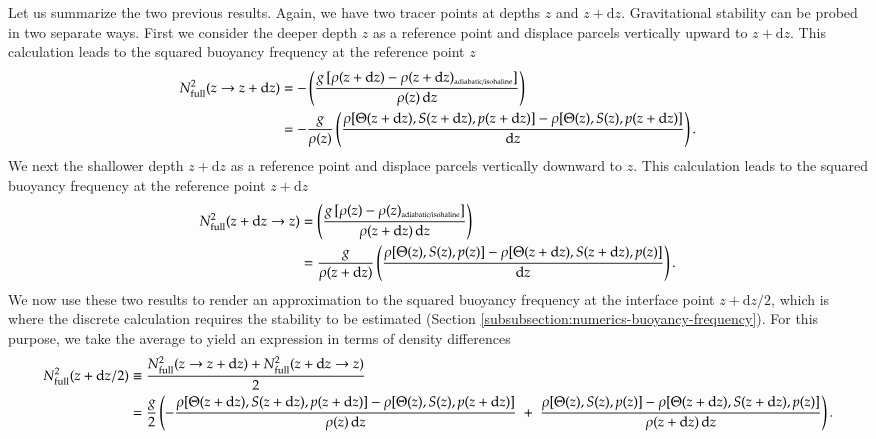 Let us summarize the two previous results.  Again, we have two tracer
points at depths $z$ and $z+\mathrm{d}z$.  Gravitational stability can
be probed in two separate ways. First we consider the deeper depth $z$
as a reference point and displace parcels vertically upward to
$z+\mathrm{d}z$.  This calculation leads to the squared buoyancy
frequency at the reference point $z$
\begin{equation}
\begin{split}
 N^{2}_{\mbox{\scriptsize full}}(z \rightarrow z + \mathrm{d}z)
 &=
 -\left(  \frac{g \, [\rho(z+\mathrm{d} z)  - \rho(z+\mathrm{d} z)_{\mbox{\tiny adiabatic/isohaline}} ]}{\rho(z)   \, \mathrm{d}z } \right)
\\
&=
 -\frac{g}{\rho(z)}  \left( 
 \frac{\rho[ \Theta(z + \mathrm{d} z), S(z + \mathrm{d} z), p(z + \mathrm{d} z)]
-
\rho[ \Theta(z), S(z), p(z + \mathrm{d}z)]
}{\mathrm{d}z}
\right).
\end{split}
\label{eq:inifinitesimal-delta-rho-elements-upwards-summary}
\end{equation}
We next the shallower depth $z+\mathrm{d}z$ as a reference point and
displace parcels vertically downward to $z$.  This calculation leads
to the squared buoyancy frequency at the reference point
$z+\mathrm{d}z$
\begin{equation}
\begin{split}
 N^{2}_{\mbox{\scriptsize full}}(z + \mathrm{d}z \rightarrow z)
 &=
 \left(  \frac{g \, [\rho(z)  - \rho(z)_{\mbox{\tiny adiabatic/isohaline}}  ]}{\rho(z+\mathrm{d}z)   \, \mathrm{d}z } \right)  
 \\
 &=
 \frac{g}{\rho(z+\mathrm{d}z)}  \left( 
 \frac{ \rho[ \Theta(z), S(z), p(z)]-
 \rho[ \Theta(z+\mathrm{d}z), S(z+\mathrm{d}z), p(z)]
  }{\mathrm{d}z}
\right).
\end{split}
\label{eq:inifinitesimal-delta-rho-elements-downward-summary}
\end{equation}
We now use these two results to render an approximation to the squared
buoyancy frequency at the interface point $z + \mathrm{d}z/2$, which
is where the discrete calculation requires the stability to be
estimated (Section \ref{subsubsection:numerics-buoyancy-frequency}).
For this purpose, we take the average to yield an expression in terms
of density differences \small
\begin{equation}
\begin{split}
N^{2}_{\mbox{\scriptsize full}}(z+\mathrm{d}z/2) 
 &\equiv 
 \frac{N^{2}_{\mbox{\scriptsize full}}(z \rightarrow z + \mathrm{d}z) + N^{2}_{\mbox{\scriptsize full}}(z + \mathrm{d}z \rightarrow z)}{2}
\\
&= \frac{g}{2} 
  \left( 
 -\frac{
    \rho[ \Theta(z + \mathrm{d} z), S(z + \mathrm{d} z), p(z + \mathrm{d} z)]
  -\rho[ \Theta(z), S(z), p(z + \mathrm{d}z)]
  }{\rho(z) \, \mathrm{d}z}
 \; + \; 
 \frac{ \rho[ \Theta(z), S(z), p(z)]-
 \rho[ \Theta(z+\mathrm{d}z), S(z+\mathrm{d}z), p(z)]
  }{\rho(z+\mathrm{d}z) \, \mathrm{d}z}
 \right).
\end{split}
\label{eq:n2-in-terms-of-density-differences}
\end{equation}
